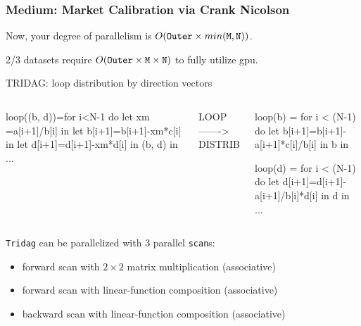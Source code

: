 \documentclass{beamer}
\renewcommand{\emph}[1]{\textcolor{structure}{#1}}
\newcommand{\emp}[1]{\textcolor{DikuRed}{ #1}}
\begin{document}
\begin{frame}[fragile,t]
  \frametitle{Medium: Market Calibration via Crank Nicolson} 

Now, your degree of parallelism is $O({\tt Outer}\times{}min{\tt (M,N)})$.\smallskip

2/3 datasets require $O({\tt Outer}\times{\tt M}\times{\tt N})$ to fully utilize {\sc gpu}.\medskip


\begin{block}{TRIDAG: loop distribution by direction vectors}
\begin{columns}
\vspace{-2ex}
\begin{colorcode}[fontsize=\scriptsize]
\emp{loop((b, d))}=for i<N-1 do
 let xm    =a[i+1]/b[i]    in
 let b[i+1]=b[i+1]-xm*c[i] in
 let d[i+1]=d[i+1]-xm*d[i]
 in (b, d)
in ...
\end{colorcode}
\vspace{-2ex}
\begin{colorcode}[fontsize=\scriptsize]
\emp{  LOOP}
\emp{------->}
\emp{DISTRIB}
\end{colorcode}
\vspace{-2ex}
\begin{colorcode}[fontsize=\scriptsize]
\emph{loop(b)} = for i < (N-1) do
  let \emph{b[i+1]}=b[i+1]-a[i+1]*c[i]\emph{/b[i]} 
  in b in

\emph{loop(d)} = for i < (N-1) do
  let \emph{d[i+1]}=d[i+1]-a[i+1]/b[i]\emph{*d[i]}
  in d
in ...
\end{colorcode} 
\end{columns}
\end{block}

\bigskip

{\tt Tridag} can be parallelized with 3 parallel {\tt scan}s:
\begin{itemize}
    \item forward scan with $2\times{}2$ matrix multiplication (associative)
    \item forward scan with linear-function composition (associative)
    \item backward scan with linear-function composition (associative)    
\end{itemize}

\end{frame}
\end{document}
